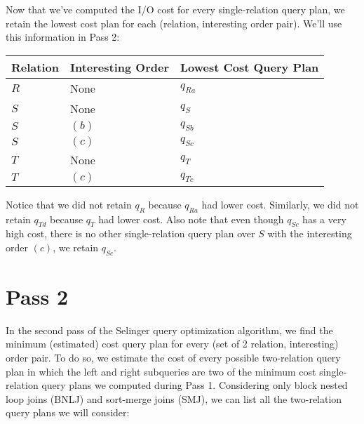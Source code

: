 \documentclass{article}
\DeclarePairedDelimiter{\ceil}{\lceil}{\rceil}
\DeclarePairedDelimiter{\parens}{(}{)}
\begin{document}
Now that we've computed the I/O cost for every single-relation query plan, we
retain the lowest cost plan for each (relation, interesting order pair).  We'll
use this information in Pass 2:

\begin{center}
  \begin{tabular}{|l|l|l|}
    \hline
    Relation & Interesting Order & Lowest Cost Query Plan \\\hline\hline
    $R$      & None              & $q_{Ra}$ \\\hline
    $S$      & None              & $q_{S}$ \\\hline
    $S$      & $(b)$             & $q_{Sb}$ \\\hline
    $S$      & $(c)$             & $q_{Sc}$ \\\hline
    $T$      & None              & $q_{T}$ \\\hline
    $T$      & $(c)$             & $q_{Tc}$ \\\hline
  \end{tabular}
\end{center}

Notice that we did not retain $q_{R}$ because $q_{Ra}$ had lower cost.
Similarly, we did not retain $q_{Td}$ because $q_{T}$ had lower cost. Also note
that even though $q_{Sc}$ has a very high cost, there is no other
single-relation query plan over $S$ with the interesting order $(c)$, we retain
$q_{Sc}$.

\section*{Pass 2}
\newcommand{\bnlj}[2]{#1 + \ceil*{\frac{#1}{B-2}}#2}
\newcommand{\sortcost}[1]{2#1\ceil*{1 + \log_{B-1}\parens*{\ceil*{\frac{#1}{B}}}}}
\newcommand{\smj}[2]{\text{SC}(#1) + \text{SC}(#2) + #1 + #2}

In the second pass of the Selinger query optimization algorithm, we find the
minimum (estimated) cost query plan for every (set of 2 relation, interesting)
order pair. To do so, we  estimate the cost of every possible two-relation
query plan in which the left and right subqueries are two of the minimum cost
single-relation query plans we computed during Pass 1. Considering only block
nested loop joins (BNLJ) and sort-merge joins (SMJ), we can list all the
two-relation query plans we will consider:

\newcommand{\joinplan}[3]{
  \plan{\node{#1} child {node{$q_{#2}$}} child {node{$q_{#3}$}};}
  \hspace{0.1cm}
}
\newcommand{\bnljplan}[2]{\joinplan{BNLJ}{#1}{#2}}
\newcommand{\smjplan}[2]{\joinplan{SMJ}{#1}{#2}}
\end{document}
